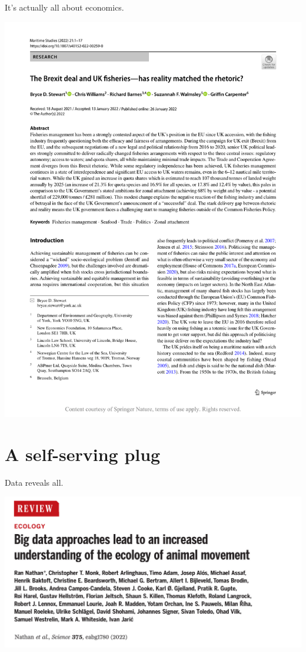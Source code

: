 \documentclass[
]{book}
\begin{document}
It's actually all about economics.

\begin{center}\includegraphics{_images/brexit} \end{center}

\hypertarget{a-self-serving-plug}{%
\chapter{A self-serving plug}\label{a-self-serving-plug}}

Data reveals all.

\begin{center}\includegraphics{_images/big} \end{center}
\end{document}
